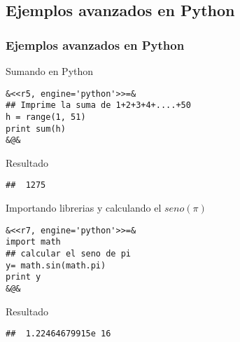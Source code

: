 \documentclass[11pt]{beamer}					%
\begin{document}
					\subsection{Ejemplos avanzados en Python}			
		 \begin{frame}[fragile]						%
			\frametitle{Ejemplos avanzados en Python}

\begin{block}{Sumando en Python}
					\begin{tiny}\begin{lstlisting}[frame=single,style=base]				
&<<r5, engine='python'>>=&
## Imprime la suma de 1+2+3+4+....+50
h = range(1, 51)
print sum(h)
&@&
				\end{lstlisting}	\end{tiny}
				\end{block}	
				\begin{block}{Resultado}
					\begin{tiny}\begin{lstlisting}[frame=single,style=base]				
##  1275
				\end{lstlisting}	\end{tiny}
				\end{block}
						
			\end{frame}

			\begin{frame}[fragile]
					\begin{block}{Importando librerias y calculando el $seno(\pi)$}
					\begin{tiny}\begin{lstlisting}[frame=single,style=base]				
&<<r7, engine='python'>>=&
import math
## calcular el seno de pi
y= math.sin(math.pi)
print y
&@&
				\end{lstlisting}	\end{tiny}
				\end{block}	
				\begin{block}{Resultado}
					\begin{tiny}\begin{lstlisting}[frame=single,style=base]				
##  1.22464679915e 16
				\end{lstlisting}	\end{tiny}
				\end{block}
						
			\end{frame}
			
\end{document}
